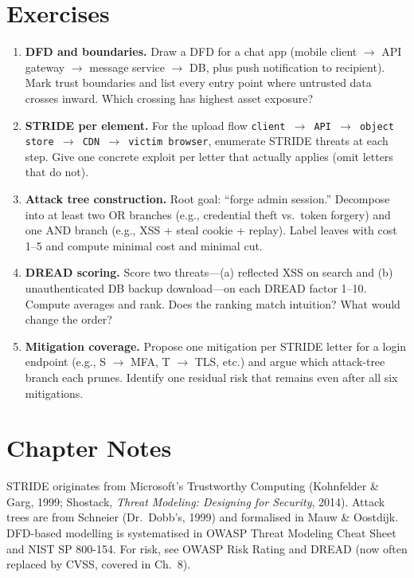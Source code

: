 \section{Exercises}
\label{sec:ch01-exercises}
\begin{enumerate}[label=E1.\arabic*, leftmargin=*, itemsep=0.6em]
    \item \textbf{DFD and boundaries.} Draw a DFD for a chat app (mobile client $\to$ API gateway $\to$ message service $\to$ DB, plus push notification to recipient). Mark trust boundaries and list every entry point where untrusted data crosses inward. Which crossing has highest asset exposure?
    \item \textbf{STRIDE per element.} For the upload flow \texttt{client $\to$ API $\to$ object store $\to$ CDN $\to$ victim browser}, enumerate STRIDE threats at each step. Give one concrete exploit per letter that actually applies (omit letters that do not).
    \item \textbf{Attack tree construction.} Root goal: ``forge admin session.'' Decompose into at least two OR branches (e.g., credential theft vs.\ token forgery) and one AND branch (e.g., XSS + steal cookie + replay). Label leaves with cost 1--5 and compute minimal cost and minimal cut.
    \item \textbf{DREAD scoring.} Score two threats---(a) reflected XSS on search and (b) unauthenticated DB backup download---on each DREAD factor 1--10. Compute averages and rank. Does the ranking match intuition? What would change the order?
    \item \textbf{Mitigation coverage.} Propose one mitigation per STRIDE letter for a login endpoint (e.g., S $\to$ MFA, T $\to$ TLS, etc.) and argue which attack-tree branch each prunes. Identify one residual risk that remains even after all six mitigations.
\end{enumerate}

\section*{Chapter Notes}
STRIDE originates from Microsoft's Trustworthy Computing (Kohnfelder \& Garg, 1999; Shostack, \emph{Threat Modeling: Designing for Security}, 2014). Attack trees are from Schneier (Dr.\ Dobb's, 1999) and formalised in Mauw \& Oostdijk. DFD-based modelling is systematised in OWASP Threat Modeling Cheat Sheet and NIST SP 800-154. For risk, see OWASP Risk Rating and DREAD (now often replaced by CVSS, covered in Ch.~8).

